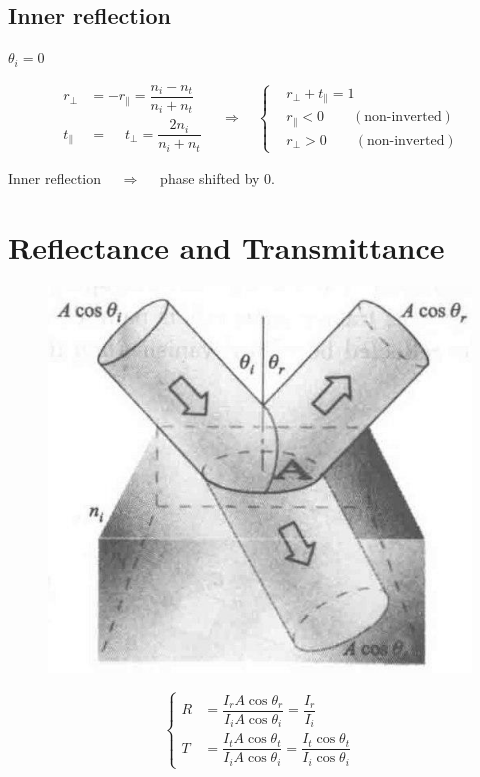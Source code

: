 \subsection{Inner reflection}

$\theta_i = 0$

\begin{equation*}
  \begin{aligned}
    r_{\perp} &= - r_{\parallel} = \dfrac{n_i - n_t}{n_i + n_t} \\
    t_{\parallel} &= \phantom{+} t_{\perp} = \dfrac{2 n_i}{n_i + n_t} 
  \end{aligned}
  \quad \Rightarrow \quad 
  \left\{
  \begin{aligned}
    & r_{\perp} + t_{\parallel} = 1 \\
    & r_{\parallel} < 0 \quad\quad \left( \text{non-inverted} \right) \\
    & r_{\perp} > 0 \quad\quad \left( \text{non-inverted} \right)
  \end{aligned}
  \right.
\end{equation*}

Inner reflection $\quad \Rightarrow \quad $ phase shifted by $0$.

\section{Reflectance and Transmittance}

\begin{figure}[H]
  \centering
  \includegraphics[width=0.4\linewidth]{figures/Reflectance-and-Transmittance}
\end{figure}

\begin{equation*}
  \left\{
  \begin{aligned}
    R &= \dfrac{I_r A \cos \theta_r}{I_i A \cos \theta_i} = \dfrac{I_r}{I_i} \\
    T &= \dfrac{I_t A \cos \theta_t}{I_i A \cos \theta_i} = \dfrac{I_t \cos \theta_t}{I_i \cos \theta_i}
  \end{aligned}
  \right.
\end{equation*}

